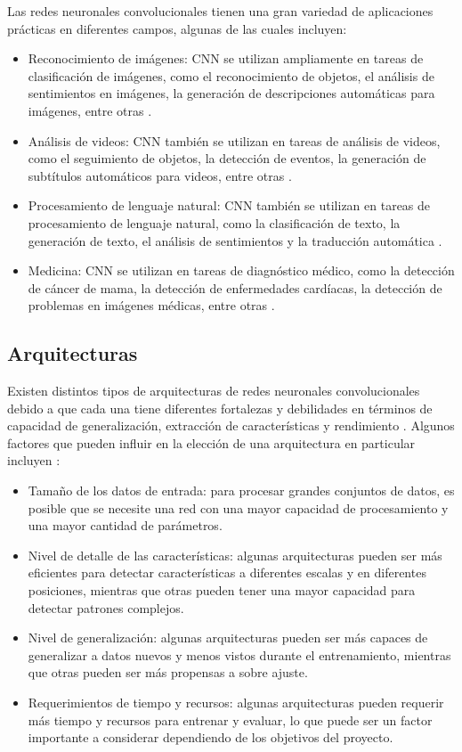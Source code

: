 Las redes neuronales convolucionales tienen una gran variedad de aplicaciones prácticas en diferentes campos, algunas
de las cuales incluyen:
\begin{itemize}
  \item Reconocimiento de imágenes: CNN se utilizan ampliamente en tareas de clasificación de imágenes, como el reconocimiento
        de objetos, el análisis de sentimientos en imágenes, la generación de descripciones automáticas para imágenes, entre
        otras \parencite{krizhevsky2017imagenet}.
  \item Análisis de videos: CNN también se utilizan en tareas de análisis de videos, como el seguimiento de objetos, la
        detección de eventos, la generación de subtítulos automáticos para videos, entre otras \parencite{simonyan2014twostream}.
  \item Procesamiento de lenguaje natural: CNN también se utilizan en tareas de procesamiento de lenguaje natural, como la
        clasificación de texto, la generación de texto, el análisis de sentimientos y la traducción automática \parencite{bugnon2020dl4papers}.
  \item Medicina: CNN se utilizan en tareas de diagnóstico médico, como la detección de cáncer de mama, la detección de
        enfermedades cardíacas, la detección de problemas en imágenes médicas, entre otras \parencite{wang2016deep}.
\end{itemize}

\subsection{Arquitecturas}

Existen distintos tipos de arquitecturas de redes neuronales convolucionales debido a que cada una tiene diferentes
fortalezas y debilidades en términos de capacidad de generalización, extracción de características y rendimiento \parencite{lecun2015deep}. Algunos factores que pueden influir en la elección de una arquitectura en particular incluyen \parencite{he2016deep}:

\begin{itemize}
  \item Tamaño de los datos de entrada: para procesar grandes conjuntos de datos, es posible que se necesite una red con una
        mayor capacidad de procesamiento y una mayor cantidad de parámetros.
  \item Nivel de detalle de las características: algunas arquitecturas pueden ser más eficientes para detectar características
        a diferentes escalas y en diferentes posiciones, mientras que otras pueden tener una mayor capacidad para detectar
        patrones complejos.
  \item Nivel de generalización: algunas arquitecturas pueden ser más capaces de generalizar a datos nuevos y menos vistos
        durante el entrenamiento, mientras que otras pueden ser más propensas a sobre ajuste.
  \item Requerimientos de tiempo y recursos: algunas arquitecturas pueden requerir más tiempo y recursos para entrenar y
        evaluar, lo que puede ser un factor importante a considerar dependiendo de los objetivos del proyecto.
\end{itemize}

